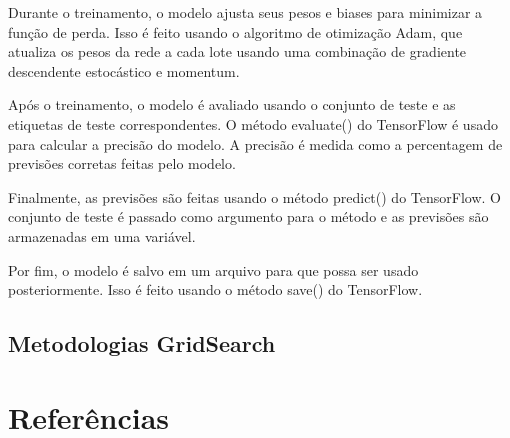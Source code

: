 \documentclass[10pt]{article}
\begin{document}
Durante o treinamento, o modelo ajusta seus pesos e biases para minimizar 
a função de perda. Isso é feito usando o algoritmo de otimização Adam, 
que atualiza os pesos da rede a cada lote usando uma combinação de 
gradiente descendente estocástico e momentum.

Após o treinamento, o modelo é avaliado usando o conjunto de teste 
e as etiquetas de teste correspondentes. O método evaluate() do TensorFlow 
é usado para calcular a precisão do modelo. A precisão é medida como a 
percentagem de previsões corretas feitas pelo modelo.

Finalmente, as previsões são feitas usando o método predict() do TensorFlow. 
O conjunto de teste é passado como argumento para o método e as previsões 
são armazenadas em uma variável.

Por fim, o modelo é salvo em um arquivo para que possa ser usado 
posteriormente. Isso é feito usando o método save() do TensorFlow.

\subsection{Metodologias GridSearch}



\section{Referências}\label{sec:sup-inf-utl}


\nocite{FirePso}
\nocite{Firefly_par}



\pagebreak
\end{document}
